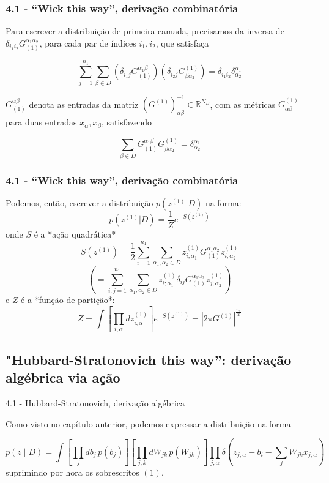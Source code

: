 \documentclass{beamer}
\begin{document}
\begin{frame}
    \frametitle{4.1 - ``Wick this way'', derivação combinatória}

    Para escrever a distribuição de primeira camada, precisamos da inversa de  $\delta_{i_1i_2}G_{(1)}^{\alpha_1\alpha_2}$, para cada par de índices $i_1,i_2$, que satisfaça \pause

    $$
    \sum_{j=1}^{n_1} \sum_{\beta \in D} (\delta_{i_1 j} G^{\alpha_1 \beta}_{(1)})(\delta_{i_2 j} G_{\beta \alpha_2}^{(1)}) = \delta_{i_1i_2}\delta^{\alpha_1}_{\alpha_2}
    $$
    \pause

    $G^{\alpha \beta}_{(1)}$ denota as entradas da matriz $(G^{(1)})^{-1}_{\alpha \beta} \in \mathbb R^{N_D}$, com as métricas $G^{(1)}_{\alpha\beta}$ para duas entradas ${x_\alpha}, {x_\beta}$, satisfazendo

    $$
    \sum_{\beta \in D} G^{\alpha_1 \beta}_{(1)}G_{\beta \alpha_2}^{(1)} = \delta^{\alpha_1}_{\alpha_2}
    $$

\end{frame}

\begin{frame}
    \frametitle{4.1 - ``Wick this way'', derivação combinatória}

    Podemos, então, escrever a distribuição $p(z^{(1)}|D)$ na forma:
    \small
    $$
    p(z^{(1)}|D) = \frac{1}{Z} e^{-S(z^{(1)})}
    $$
    onde \pause $S$ é a *ação quadrática*
    $$
    S(z^{(1)}) = \frac{1}{2} \sum_{i=1}^{n_1} \sum_{\alpha_1,\alpha_2 \in D} z^{(1)}_{i;\alpha_1} G^{\alpha_1 \alpha_2}_{(1)} z^{(1)}_{i;\alpha_2}
    $$
    \pause
    $$
    \left(=\sum_{i,j=1}^{n_1} \sum_{\alpha_1,\alpha_2 \in D} z^{(1)}_{i;\alpha_1} \delta_{ij} G^{\alpha_1 \alpha_2}_{(1)} z^{(1)}_{j;\alpha_2} \right)
    $$
    \pause
    e $Z$ é a *função de partição*:
    $$
    Z = \int \left[ \prod_{i,\alpha} dz_{i,\alpha}^{(1)} \right] e^{-S(z^{(1)})} = |2 \pi G^{(1)}|^{\frac{n_1}{2}}
    $$
\end{frame}

\subsection{"Hubbard-Stratonovich this way'': derivação algébrica via ação}
\begin{frame}
\tableofcontents[currentsubsection]
\end{frame}

\begin{frame}{4.1 - Hubbard-Stratonovich, derivação algébrica}
    
    Como visto no capítulo anterior, podemos expressar a distribuição na forma

    \footnotesize
    $$
    p(z \mid D) = \int \left[ \prod_j db_j \, p(b_j) \right] 
    \left[ \prod_{j,k} dW_{jk} \, p(W_{jk}) \right] 
    \prod_{j,\alpha} \delta \left( z_{j;\alpha} - b_i - \sum_j W_{jk} x_{j;\alpha} \right)
    $$
    \normalsize
    suprimindo por hora os sobrescritos $(1)$.
\end{frame}
\end{document}
